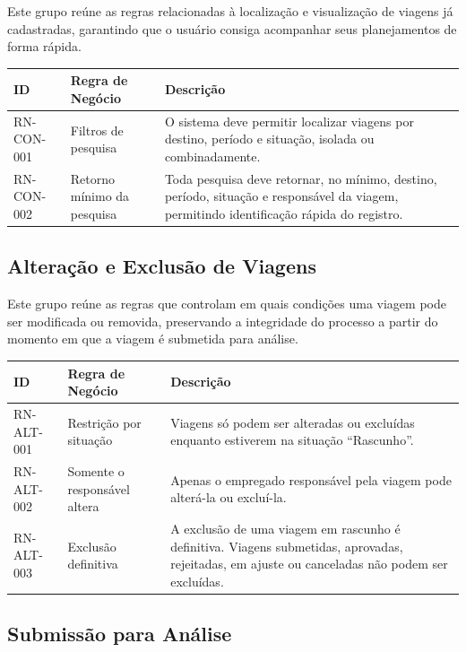 \documentclass[12pt,article,oneside,a4paper]{abntex2}
\begin{document}
Este grupo reúne as regras relacionadas à localização e visualização de
viagens já cadastradas, garantindo que o usuário consiga acompanhar seus
planejamentos de forma rápida.

\begin{xltabular}{\textwidth}{|l|l|Y|}
\hline
{}
\textbf{ID} & \textbf{Regra de Negócio} & \textbf{Descrição} \\
\hline
\endhead
RN-CON-001 & Filtros de pesquisa & O sistema deve permitir localizar viagens por destino, período e situação, isolada ou combinadamente. \\
\hline
RN-CON-002 & Retorno mínimo da pesquisa & Toda pesquisa deve retornar, no mínimo, destino, período, situação e responsável da viagem, permitindo identificação rápida do registro. \\
\hline
\end{xltabular}

\bigskip

\subsection{Alteração e Exclusão de Viagens}

Este grupo reúne as regras que controlam em quais condições uma viagem pode
ser modificada ou removida, preservando a integridade do processo a partir do
momento em que a viagem é submetida para análise.

\begin{xltabular}{\textwidth}{|l|l|Y|}
\hline
{}
\textbf{ID} & \textbf{Regra de Negócio} & \textbf{Descrição} \\
\hline
\endhead
RN-ALT-001 & Restrição por situação & Viagens só podem ser alteradas ou excluídas enquanto estiverem na situação ``Rascunho''. \\
\hline
RN-ALT-002 & Somente o responsável altera & Apenas o empregado responsável pela viagem pode alterá-la ou excluí-la. \\
\hline
RN-ALT-003 & Exclusão definitiva & A exclusão de uma viagem em rascunho é definitiva. Viagens submetidas, aprovadas, rejeitadas, em ajuste ou canceladas não podem ser excluídas. \\
\hline
\end{xltabular}

\bigskip

\subsection{Submissão para Análise}
\end{document}
